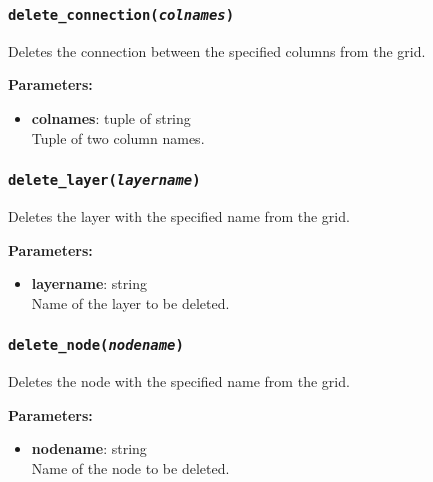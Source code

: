 \begin{snugshade}\subsubsection{\texttt{delete\_connection(\emph{colnames})}}\end{snugshade}
\label{sec:mulgrid:delete_connection}

Deletes the connection between the specified columns from the grid.

\textbf{Parameters:}
\begin{itemize}
\item \textbf{colnames}: tuple of string\\
  Tuple of two column names.
\end{itemize}

\begin{snugshade}\subsubsection{\texttt{delete\_layer(\emph{layername})}}\end{snugshade}
\label{sec:mulgrid:delete_layer}

Deletes the layer with the specified name from the grid.

\textbf{Parameters:}
\begin{itemize}
\item \textbf{layername}: string\\
  Name of the layer to be deleted.
\end{itemize}

\begin{snugshade}\subsubsection{\texttt{delete\_node(\emph{nodename})}}\end{snugshade}
\label{sec:mulgrid:delete_node}

Deletes the node with the specified name from the grid.

\textbf{Parameters:}
\begin{itemize}
\item \textbf{nodename}: string\\
  Name of the node to be deleted.
\end{itemize}

